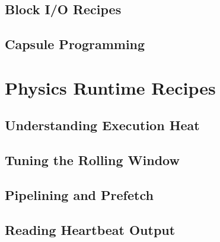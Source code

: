 \chapter{Block I/O Recipes}

\chapter{Capsule Programming}


\part{Physics Runtime Recipes}

\chapter{Understanding Execution Heat}

\chapter{Tuning the Rolling Window}


\chapter{Pipelining and Prefetch}


\chapter{Reading Heartbeat Output}


